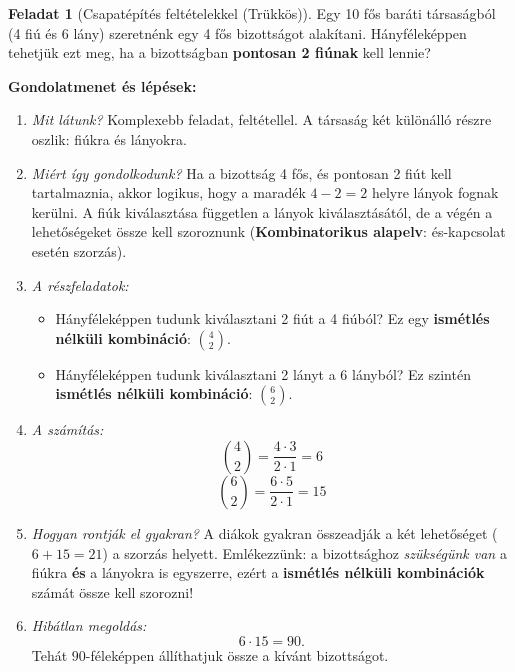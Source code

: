\documentclass[a4paper,12pt]{article}
\theoremstyle{definition} %
\newtheorem*{problem}{Feladat}
\begin{document}
\vspace{1em}

\begin{problem}[Csapatépítés feltételekkel (Trükkös)]
Egy 10 fős baráti társaságból (4 fiú és 6 lány) szeretnénk egy 4 fős bizottságot alakítani. Hányféleképpen tehetjük ezt meg, ha a bizottságban \textbf{pontosan 2 fiúnak} kell lennie?
\end{problem}

\textbf{Gondolatmenet és lépések:}
\begin{enumerate}
    \item \textit{Mit látunk?} Komplexebb feladat, feltétellel. A társaság két különálló részre oszlik: fiúkra és lányokra.
    \item \textit{Miért így gondolkodunk?} Ha a bizottság 4 fős, és pontosan 2 fiút kell tartalmaznia, akkor logikus, hogy a maradék $4 - 2 = 2$ helyre lányok fognak kerülni. A fiúk kiválasztása független a lányok kiválasztásától, de a végén a lehetőségeket össze kell szoroznunk (\textbf{Kombinatorikus alapelv}: és-kapcsolat esetén szorzás).
    \item \textit{A részfeladatok:}
   \begin{itemize}
       \item Hányféleképpen tudunk kiválasztani 2 fiút a 4 fiúból? Ez egy \textbf{ismétlés nélküli kombináció}: $\binom{4}{2}$.
       \item Hányféleképpen tudunk kiválasztani 2 lányt a 6 lányból? Ez szintén \textbf{ismétlés nélküli kombináció}: $\binom{6}{2}$.
   \end{itemize}
    \item \textit{A számítás:}
   $$\binom{4}{2} = \frac{4 \cdot 3}{2 \cdot 1} = 6$$
   $$\binom{6}{2} = \frac{6 \cdot 5}{2 \cdot 1} = 15$$
    \item \textit{Hogyan rontják el gyakran?} A diákok gyakran összeadják a két lehetőséget ($6 + 15 = 21$) a szorzás helyett. Emlékezzünk: a bizottsághoz \textit{szükségünk van} a fiúkra \textbf{és} a lányokra is egyszerre, ezért a \textbf{ismétlés nélküli kombinációk} számát össze kell szorozni!
    \item \textit{Hibátlan megoldás:}
   $$6 \cdot 15 = 90.$$
   Tehát $90$-féleképpen állíthatjuk össze a kívánt bizottságot.
\end{enumerate}
\end{document}
